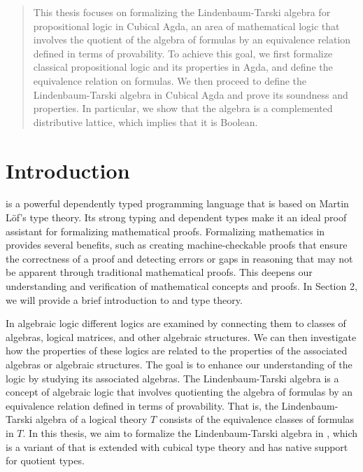 \documentclass[titlepage]{article}
\begin{document}

\begin{abstract}
    This thesis focuses on formalizing the Lindenbaum-Tarski algebra for propositional logic in Cubical Agda, an area of mathematical logic that involves the quotient of the algebra of formulas by an equivalence relation defined in terms of provability. To achieve this goal, we first formalize classical propositional logic and its properties in Agda, and define the equivalence relation on formulas. We then proceed to define the Lindenbaum-Tarski algebra in Cubical Agda and prove its soundness and properties. In particular, we show that the algebra is a complemented distributive lattice, which implies that it is Boolean.
\end{abstract}

\tableofcontents
\thispagestyle{empty}
\newpage
\setcounter{page}{1}



\section{Introduction}

\Agda is a powerful dependently typed programming language that is based on Martin Löf's type theory\cite{Martin-Lof1984-MARITT-18}. Its strong typing and dependent types make it an ideal proof assistant for formalizing mathematical proofs\cite{AgdaDoc}. Formalizing mathematics in \Agda provides several benefits, such as creating machine-checkable proofs that ensure the correctness of a proof and detecting errors or gaps in reasoning that may not be apparent through traditional mathematical proofs. This deepens our understanding and verification of mathematical concepts and proofs. In Section 2, we will provide a brief introduction to \Agda and type theory.

In algebraic logic different logics are examined by connecting them to classes of algebras, logical matrices, and other algebraic structures. We can then investigate how the properties of these logics are related to the properties of the associated algebras or algebraic structures. The goal is to enhance our understanding of the logic by studying its associated algebras\cite{sep-logic-algebraic-propositional}.
The Lindenbaum-Tarski algebra is a concept of algebraic logic that involves quotienting the algebra of formulas by an equivalence relation defined in terms of provability\cite{wikipedia}. That is, the Lindenbaum-Tarski algebra of a logical theory $T$ consists of the equivalence classes of formulas in $T$. In this thesis, we aim to formalize the Lindenbaum-Tarski algebra in \CubicalAgda, which is a variant of \Agda that is extended with cubical type theory and has native support for quotient types.
\end{document}
